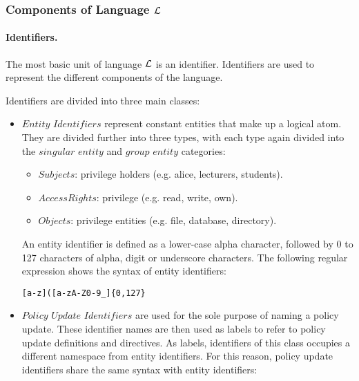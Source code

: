 \documentclass[10pt, twocolumn]{article}
\begin{document}
      \subsubsection{Components of Language $\cal{L}$}

        \paragraph{Identifiers.}
          The most basic unit of language $\cal{L}$ is an identifier.
          Identifiers are used to represent the different components of the
          language.  
    
          Identifiers are divided into three main classes:

          \begin{itemize}
            \item
              $Entity$ $Identifiers$ represent constant entities that make up a
              logical atom. They are divided further into three types, with
              each type again divided into the $singular$ $entity$ and $group$
              $entity$ categories:

              \begin{itemize}
                \item
                  $Subjects$: privilege holders (e.g. alice, lecturers,
                  students).
                \item
                  $Access Rights$: privilege (e.g. read, write, own).
                \item
                  $Objects$: privilege entities (e.g. file, database,
                  directory).
              \end{itemize}

              An entity identifier is defined as a lower-case alpha character,
              followed by 0 to 127 characters of alpha, digit or underscore
              characters. The following regular expression shows the syntax
              of entity identifiers:

              \begin{verbatim}[a-z]([a-zA-Z0-9_]{0,127}\end{verbatim}

            \item
              $Policy$ $Update$ $Identifiers$ are used for the sole purpose of
              naming a policy update. These identifier names are then used as
              labels to refer to policy update definitions and directives. As
              labels, identifiers of this class occupies a different namespace
              from entity identifiers. For this reason, policy update
              identifiers share the same syntax with entity identifiers:


\end{itemize}
\end{document}
